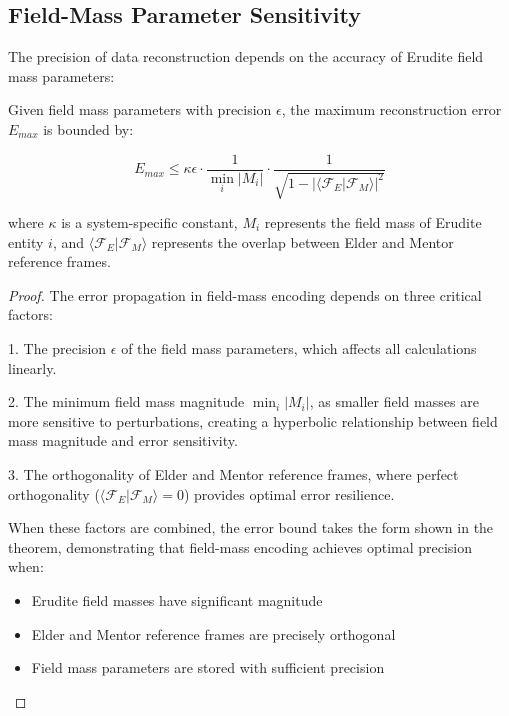 \subsection{Field-Mass Parameter Sensitivity}

The precision of data reconstruction depends on the accuracy of Erudite field mass parameters:

\begin{theorem}
Given field mass parameters with precision $\epsilon$, the maximum reconstruction error $E_{max}$ is bounded by:

\begin{equation}
E_{max} \leq \kappa \epsilon \cdot \frac{1}{\min_i |M_i|} \cdot \frac{1}{\sqrt{1 - |\langle \mathcal{F}_E|\mathcal{F}_M \rangle|^2}}
\end{equation}

where $\kappa$ is a system-specific constant, $M_i$ represents the field mass of Erudite entity $i$, and $\langle \mathcal{F}_E|\mathcal{F}_M \rangle$ represents the overlap between Elder and Mentor reference frames.
\end{theorem}

\begin{proof}
The error propagation in field-mass encoding depends on three critical factors:

1. The precision $\epsilon$ of the field mass parameters, which affects all calculations linearly.

2. The minimum field mass magnitude $\min_i |M_i|$, as smaller field masses are more sensitive to perturbations, creating a hyperbolic relationship between field mass magnitude and error sensitivity.

3. The orthogonality of Elder and Mentor reference frames, where perfect orthogonality ($\langle \mathcal{F}_E|\mathcal{F}_M \rangle = 0$) provides optimal error resilience.

When these factors are combined, the error bound takes the form shown in the theorem, demonstrating that field-mass encoding achieves optimal precision when:
\begin{itemize}
    \item Erudite field masses have significant magnitude
    \item Elder and Mentor reference frames are precisely orthogonal
    \item Field mass parameters are stored with sufficient precision
\end{itemize}
\end{proof}

